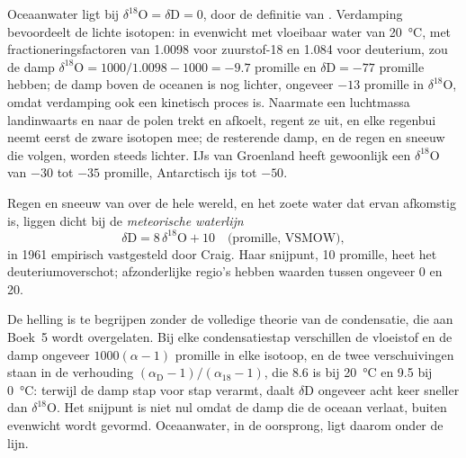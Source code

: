 Oceaanwater ligt bij $\delta^{18}\mathrm{O} = \delta\mathrm{D} = 0$, door de
definitie van . Verdamping bevoordeelt de lichte isotopen: in evenwicht
met vloeibaar water van \qty{20}{\degreeCelsius}, met fractioneringsfactoren van
1.0098 voor zuurstof-18 en 1.084 voor deuterium, zou de damp
$\delta^{18}\mathrm{O} = 1000/1.0098 - 1000 = -9.7$ promille en $\delta\mathrm{D} =
-77$ promille hebben; de damp boven de oceanen is nog lichter, ongeveer $-13$ promille
in $\delta^{18}\mathrm{O}$, omdat verdamping ook een kinetisch proces is.
Naarmate een luchtmassa landinwaarts en naar de polen trekt en afkoelt, regent ze uit, en
elke regenbui neemt eerst de zware isotopen mee; de resterende damp, en de regen en
sneeuw die volgen, worden steeds lichter. IJs van Groenland heeft gewoonlijk een
$\delta^{18}\mathrm{O}$ van $-30$ tot $-35$ promille, Antarctisch ijs tot $-50$.

\begin{proposition}\label{prop:b2:isotope-geochemistry:mwl}
Regen en sneeuw van over de hele wereld, en het zoete water dat ervan afkomstig is,
liggen dicht bij de \emph{meteorische waterlijn}
\[
  \delta\mathrm{D} = 8\,\delta^{18}\mathrm{O} + 10 \quad\text{(promille, VSMOW)},
\]
in 1961 empirisch vastgesteld door Craig. Haar snijpunt, 10 promille, heet
het deuteriumoverschot; afzonderlijke regio's hebben waarden tussen ongeveer 0 en 20.
\end{proposition}
\admitted

\noindent De helling is te begrijpen zonder de volledige theorie van de condensatie,
die aan Boek~5 wordt overgelaten. Bij elke condensatiestap verschillen de vloeistof
en de damp ongeveer $1000(\alpha - 1)$ promille in elke isotoop, en
de twee verschuivingen staan in de verhouding $(\alpha_{\mathrm D}-1)/(\alpha_{18}-1)$, die
8.6 is bij \qty{20}{\degreeCelsius} en 9.5 bij \qty{0}{\degreeCelsius}: terwijl de
damp stap voor stap verarmt, daalt $\delta\mathrm{D}$ ongeveer acht keer sneller
dan $\delta^{18}\mathrm{O}$. Het snijpunt is niet nul omdat de damp die
de oceaan verlaat, buiten evenwicht wordt gevormd. Oceaanwater, in de oorsprong, ligt daarom
onder de lijn.

